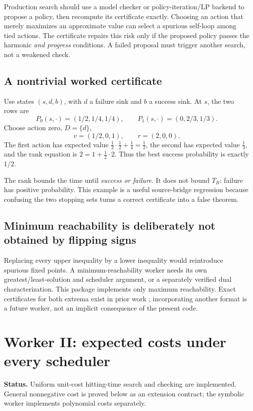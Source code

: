 \documentclass[11pt,letterpaper]{article}
\theoremstyle{definition}\newtheorem{definition}[theorem]{Definition}
\theoremstyle{remark}\newtheorem{remark}[theorem]{Remark}
\newcommand{\status}[1]{\par\noindent\textbf{Status.} #1\par}
\begin{document}
Production search should use a model checker or policy-iteration/LP backend to propose a policy, then recompute its certificate exactly. Choosing an action that merely maximizes an approximate value can select a spurious self-loop among tied actions. The certificate repairs this risk only if the proposed policy passes the harmonic \emph{and progress} conditions. A failed proposal must trigger another search, not a weakened check.

\subsection{A nontrivial worked certificate}
Use states $(s,d,b)$, with $d$ a failure sink and $b$ a success sink. At $s$, the two rows are
\[
 P_0(s,\cdot)=(1/2,1/4,1/4),\qquad
 P_1(s,\cdot)=(0,2/3,1/3).
\]
Choose action zero, $D=\{d\}$,
\[
 v=(1/2,0,1),\qquad r=(2,0,0).
\]
The first action has expected value $\tfrac12\cdot\tfrac12+\tfrac14=\tfrac12$, the second has expected value $\tfrac13$, and the rank equation is $2=1+\tfrac12\cdot2$. Thus the best success probability is exactly $1/2$.

The rank bounds the time until \emph{success or failure}. It does not bound $T_B$: failure has positive probability. This example is a useful source-bridge regression because confusing the two stopping sets turns a correct certificate into a false theorem.

\subsection{Minimum reachability is deliberately not obtained by flipping signs}
Replacing every upper inequality by a lower inequality would reintroduce spurious fixed points. A minimum-reachability worker needs its own greatest/least-solution and scheduler argument, or a separately verified dual characterization. This package implements only maximum reachability. Exact certificates for both extrema exist in prior work \cite{farkas}; incorporating another format is a future worker, not an implicit consequence of the present code.

\section{Worker II: expected costs under every scheduler}
\status{Uniform unit-cost hitting-time search and checking are implemented. General nonnegative cost is proved below as an extension contract; the symbolic worker implements polynomial costs separately.}
\end{document}
